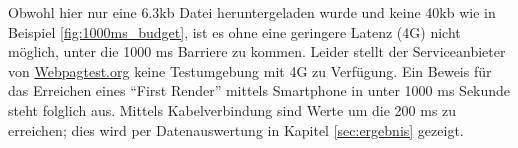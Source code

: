 	  Obwohl hier nur eine 6.3kb Datei heruntergeladen wurde und keine 40kb wie in Beispiel \ref{fig:1000ms_budget}, ist es ohne eine geringere Latenz (4G) nicht möglich, unter die 1000 ms Barriere zu kommen. Leider stellt der Serviceanbieter von \url{Webpagtest.org} keine Testumgebung mit 4G zu Verfügung. Ein Beweis für das Erreichen eines "`First Render"' mittels Smartphone in unter 1000 ms Sekunde steht folglich aus. Mittels Kabelverbindung sind Werte um die 200 ms zu erreichen; dies wird per Datenauswertung in Kapitel \ref{sec:ergebnis} gezeigt.



\pagebreak
